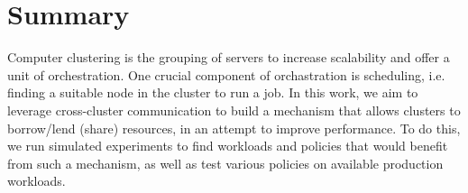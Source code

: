 \section{Summary}
Computer clustering is the grouping of servers to increase scalability and offer a unit of orchestration. 
One crucial component of orchastration is scheduling, i.e. finding a suitable node in the cluster 
to run a job. In this work, we aim to leverage cross-cluster communication to build a mechanism that allows 
clusters to borrow/lend (share) resources, in an attempt to improve performance. 
To do this, we run simulated experiments to find workloads and policies that 
would benefit from such a mechanism, as well as test various policies on available production workloads.
